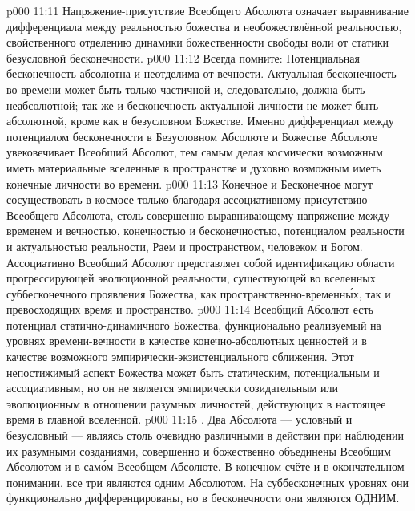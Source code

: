 \vs p000 11:11 \pc Напряжение\hyp{}присутствие Всеобщего Абсолюта означает выравнивание дифференциала между реальностью божества и необожествлённой реальностью, свойственного отделению динамики божественности свободы воли от статики безусловной бесконечности.
\vs p000 11:12 \pc Всегда помните: Потенциальная бесконечность абсолютна и неотделима от вечности. Актуальная бесконечность во времени может быть только частичной и, следовательно, должна быть неабсолютной; так же и бесконечность актуальной личности не может быть абсолютной, кроме как в безусловном Божестве. Именно дифференциал между потенциалом бесконечности в Безусловном Абсолюте и Божестве Абсолюте увековечивает Всеобщий Абсолют, тем самым делая космически возможным иметь материальные вселенные в пространстве и духовно возможным иметь конечные личности во времени.
\vs p000 11:13 Конечное и Бесконечное могут сосуществовать в космосе только благодаря ассоциативному присутствию Всеобщего Абсолюта, столь совершенно выравнивающему напряжение между временем и вечностью, конечностью и бесконечностью, потенциалом реальности и актуальностью реальности, Раем и пространством, человеком и Богом. Ассоциативно Всеобщий Абсолют представляет собой идентификацию области прогрессирующей эволюционной реальности, существующей во вселенных суббесконечного проявления Божества, как пространственно\hyp{}временн\'ых, так и превосходящих время и пространство.
\vs p000 11:14 Всеобщий Абсолют есть потенциал статично\hyp{}динамичного Божества, функционально реализуемый на уровнях времени\hyp{}вечности в качестве конечно\hyp{}абсолютных ценностей и в качестве возможного эмпирически\hyp{}экзистенциального сближения. Этот непостижимый аспект Божества может быть статическим, потенциальным и ассоциативным, но он не является эмпирически созидательным или эволюционным в отношении разумных личностей, действующих в настоящее время в главной вселенной.
\vs p000 11:15 \pc {}. Два Абсолюта --- условный и безусловный --- являясь столь очевидно различными в действии при наблюдении их разумными созданиями, совершенно и божественно объединены Всеобщим Абсолютом и в сам\'ом Всеобщем Абсолюте. В конечном счёте и в окончательном понимании, все три являются одним Абсолютом. На суббесконечных уровнях они функционально дифференцированы, но в бесконечности они являются ОДНИМ.
